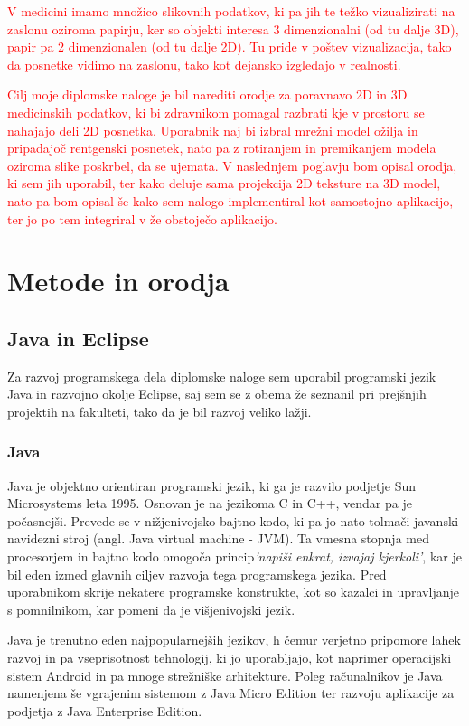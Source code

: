 \documentclass[a4paper, 12pt]{book}
\begin{document}
\textcolor{red}{V medicini imamo množico slikovnih podatkov, ki pa jih te težko vizualizirati na zaslonu oziroma papirju, ker so objekti interesa 3 dimenzionalni (od tu dalje 3D), papir pa 2 dimenzionalen (od tu dalje 2D). Tu pride v poštev vizualizacija, tako da posnetke vidimo na zaslonu, tako kot dejansko izgledajo v realnosti.}

\textcolor{red}{Cilj moje diplomske naloge je bil narediti orodje za poravnavo 2D in 3D medicinskih podatkov, ki bi zdravnikom pomagal razbrati kje v prostoru se nahajajo deli 2D posnetka. Uporabnik naj bi izbral mrežni model ožilja in pripadajoč rentgenski posnetek, nato pa z rotiranjem in premikanjem modela oziroma slike poskrbel, da se ujemata. V naslednjem poglavju bom opisal orodja, ki sem jih uporabil, ter kako deluje sama projekcija 2D teksture na 3D model, nato pa bom opisal še kako sem nalogo implementiral kot samostojno aplikacijo, ter jo po tem integriral v že obstoječo aplikacijo.}

\chapter{Metode in orodja}
\section{Java in Eclipse}
Za razvoj programskega dela diplomske naloge sem uporabil programski jezik Java\cite{Java} in razvojno okolje Eclipse\cite{Eclipse}, saj sem se z obema že seznanil pri prejšnjih projektih na fakulteti, tako da je bil razvoj veliko lažji.
\subsection*{Java}
Java je objektno orientiran programski jezik, ki ga je razvilo podjetje Sun Microsystems leta 1995. Osnovan je na jezikoma C in C++, vendar pa je počasnejši. Prevede se v nižjenivojsko bajtno kodo, ki pa jo nato tolmači javanski navidezni stroj (angl. Java virtual machine - JVM). Ta vmesna stopnja med procesorjem in bajtno kodo omogoča princip\emph{'napiši enkrat, izvajaj kjerkoli'}, kar je bil eden izmed glavnih ciljev razvoja tega programskega jezika. Pred uporabnikom skrije nekatere programske konstrukte, kot so kazalci in upravljanje s pomnilnikom, kar pomeni da je višjenivojski jezik. 

Java je trenutno eden najpopularnejših jezikov\cite{javapopularity}, h čemur verjetno pripomore lahek razvoj in pa vseprisotnost tehnologij, ki jo uporabljajo, kot naprimer operacijski sistem Android in pa mnoge strežniške arhitekture. Poleg računalnikov je Java namenjena še vgrajenim sistemom z Java Micro Edition ter razvoju aplikacije za podjetja z Java Enterprise Edition.
\end{document}
